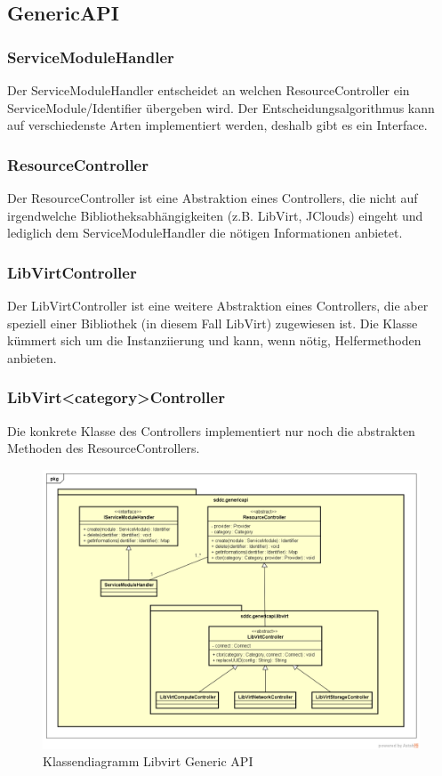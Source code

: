 \subsection{GenericAPI}
\subsubsection{ServiceModuleHandler}
Der ServiceModuleHandler entscheidet an welchen ResourceController ein ServiceModule/Identifier übergeben wird.
Der Entscheidungsalgorithmus kann auf verschiedenste Arten implementiert werden, deshalb gibt es ein Interface.

\subsubsection{ResourceController}
Der ResourceController ist eine Abstraktion eines Controllers, die nicht auf irgendwelche 
Bibliotheksabhängigkeiten (z.B. LibVirt, JClouds) eingeht und lediglich dem ServiceModuleHandler die nötigen Informationen anbietet.

\subsubsection{LibVirtController}
Der LibVirtController ist eine weitere Abstraktion eines Controllers, die aber speziell einer 
Bibliothek (in diesem Fall LibVirt) zugewiesen ist. Die Klasse kümmert sich um die 
Instanziierung und kann, wenn nötig, Helfermethoden anbieten.

\subsubsection{LibVirt<category>Controller}

Die konkrete Klasse des Controllers implementiert nur noch die abstrakten Methoden des ResourceControllers.

\begin{figure}[!htbp]
\includegraphics[width=\textwidth]{./05_Design/04_Architektur/genericapi}
\caption{Klassendiagramm Libvirt Generic API}
\end{figure}
\newpage  
